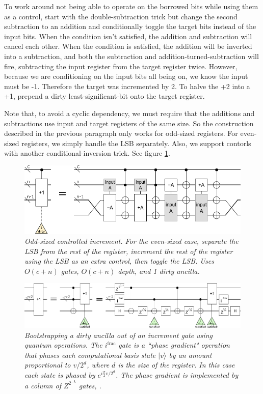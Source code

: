 \documentclass[twocolumn]{article}
\begin{document}
To work around not being able to operate on the borrowed bits while using them as a control, start with the double-subtraction trick but change the second subtraction to an addition and conditionally toggle the target bits instead of the input bits.
When the condition isn't satisfied, the addition and subtraction will cancel each other.
When the condition is satisfied, the addition will be inverted into a subtraction, and both the subtraction and addition-turned-subtraction will fire, subtracting the input register from the target register twice.
However, because we are conditioning on the input bits all being on, we know the input must be -1.
Therefore the target was incremented by 2.
To halve the +2 into a +1, prepend a dirty least-significant-bit onto the target register.

Note that, to avoid a cyclic dependency, we must require that the additions and subtractions use input and target registers of the same size.
So the construction described in the previous paragraph only works for odd-sized registers.
For even-sized registers, we simply handle the LSB separately.
Also, we support contorls with another conditional-inversion trick.
See figure \ref{fig:controlled-increment-odd}.

\begin{figure}
  \centering
  \includegraphics[width=\linewidth]{assets/controlled-increment-odd.png}
  \caption{\em
    Odd-sized controlled increment.
    For the even-sized case, separate the LSB from the rest of the register, increment the rest of the register using the LSB as an extra control, then toggle the LSB.
    Uses $O(c+n)$ gates, $O(c+n)$ depth, and 1 dirty ancilla.
  }
  \label{fig:controlled-increment-odd}
\end{figure}

\begin{figure}
  \centering
  \includegraphics[width=\linewidth]{assets/ancilla-bootstrap.png}
  \caption{\em Bootstrapping a dirty ancilla out of an increment gate using quantum operations.
  The $i^{\text{frac}}$ gate is a ``phase gradient" operation that phases each computational basis state $|v\rangle$ by an amount proportional to $v/2^d$, where $d$ is the size of the register.
  In this case each state is phased by $e^{i \frac{\pi}{2} v/2^d}$.
  The phase gradient is implemented by a column of $Z^{2^{-k}}$ gates, .}
  \label{fig:bootstrap-ancilla}
\end{figure}
\end{document}
